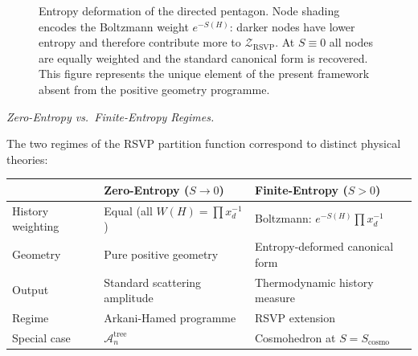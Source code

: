 \documentclass[11pt]{article}
\theoremstyle{plain}
\theoremstyle{definition}
\theoremstyle{remark}
\newcommand{\Sf}{S}
\newcommand{\ZRSVP}{\mathcal{Z}_{\mathrm{RSVP}}}
\begin{document}
\begin{figure}[H]
\centering
{}
\caption{Entropy deformation of the directed pentagon. Node shading
encodes the Boltzmann weight $e^{-\Sf(H)}$: darker nodes have lower
entropy and therefore contribute more to $\ZRSVP$. At $\Sf\equiv 0$
all nodes are equally weighted and the standard canonical form is
recovered. This figure represents the unique element of the present
framework absent from the positive geometry programme.}
\end{figure}

\medskip\noindent\textit{Zero-Entropy vs.\ Finite-Entropy Regimes.}

The two regimes of the RSVP partition function correspond to distinct physical theories:

\begin{center}
\begin{tabular}{lll}
\toprule
 & Zero-Entropy ($\Sf\to 0$) & Finite-Entropy ($\Sf > 0$) \\
\midrule
History weighting & Equal (all $W(H)=\prod x_d^{-1}$) & Boltzmann: $e^{-\Sf(H)}\prod x_d^{-1}$ \\
Geometry & Pure positive geometry & Entropy-deformed canonical form \\
Output & Standard scattering amplitude & Thermodynamic history measure \\
Regime & Arkani-Hamed programme & RSVP extension \\
Special case & $\mathcal{A}_n^{\mathrm{tree}}$ & Cosmohedron at $\Sf=\Sf_{\mathrm{cosmo}}$ \\
\bottomrule
\end{tabular}
\end{center}
\end{document}
